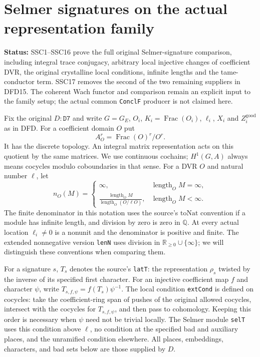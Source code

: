 \documentclass[11pt,a4paper]{article}
\numberwithin{equation}{section}
\theoremstyle{remark}\newtheorem{remark}[theorem]{Remark}
\newcommand{\status}[1]{\textbf{Status:} #1}
\begin{document}
\section{Selmer signatures on the actual representation family}
\label{sec:selmer-signature-v052}

\status{SSC1--SSC16 prove the full original Selmer-signature comparison,
including integral trace conjugacy, arbitrary local injective changes of
coefficient DVR, the original crystalline local conditions, infinite
lengths and the tame-conductor term. SSC17 removes the second of the two
remaining suppliers in DFD15. The coherent Wach functor and comparison
remain an explicit input to the family setup; the actual common
\texttt{Concl\allowbreak F} producer is not claimed here.}

Fix the original $D:\texttt{D7}$ and write $G=G_E$, $O_i$,
$K_i=\operatorname{Frac}(O_i)$, $\ell_i$, $X_i$ and
$Z_i^{\mathrm{good}}$ as in DFD. For a coefficient domain $O$ put
\[
 A_O^r=\operatorname{Frac}(O)^r/O^r.
\]
It has the discrete topology. An integral matrix representation acts
on this quotient by the same matrices. We use continuous cochains;
\(H^1(G,A)\) always means cocycles modulo coboundaries in that sense.
For a DVR $O$ and natural number $\ell$, let
\[
 n_O(M)=
 \begin{cases}
 \infty,&\operatorname{length}_O M=\infty,\\
 \displaystyle\frac{\operatorname{length}_O M}
 {\operatorname{length}_O(O/\ell O)},
       &\operatorname{length}_O M<\infty.
 \end{cases}                                                    \tag{SSC.1}
\]
The finite denominator in this notation uses the source's
\(\mathrm{toNat}\) convention if a module has infinite length, and
division by zero is zero in $\mathbb Q$. At every actual location
$\ell_i\ne0$ is a nonunit and the denominator is positive and finite.
The extended nonnegative version \texttt{len\allowbreak N} uses division in
$\mathbb R_{\ge0}\cup\{\infty\}$; we will distinguish these conventions
when comparing them.

For a signature $s$, $T_s$ denotes the source's \texttt{lat\allowbreak T}:
the representation $\rho_s$ twisted by the inverse of its specified
first character. For an injective coefficient map $f$ and character
$\psi$, write $T_{s,f,\psi}=f(T_s)\psi^{-1}$. The local condition
\texttt{ext\allowbreak Cond} is defined on cocycles: take the coefficient-ring
span of pushes of the original allowed cocycles, intersect with the
cocycles for $T_{s,f,\psi}$, and then pass to cohomology. Keeping this
order is necessary when $\psi$ need not be trivial locally.
The Selmer module \texttt{sel\allowbreak T} uses this condition above $\ell$,
no condition at the specified bad and auxiliary places, and the
unramified condition elsewhere. All places, embeddings, characters,
and bad sets below are those supplied by $D$.
\end{document}
